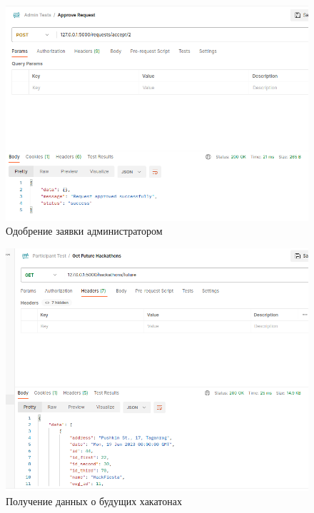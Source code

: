 \begin{figure}[H]
	\begin{center}
		\includegraphics[page=1,scale=0.5]{assets/ex-approve.png}
	\end{center}
	\caption{Одобрение заявки администратором}
	\label{ex-approve}
\end{figure}

\begin{figure}[H]
	\begin{center}
		\includegraphics[page=1,scale=0.5]{assets/ex-future.png}
	\end{center}
	\caption{Получение данных о будущих хакатонах}
	\label{ex-future}
\end{figure}

